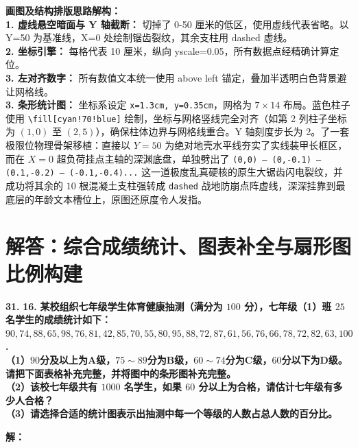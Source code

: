 \vspace{0.4cm}
{\small\color{blue!70!black}
\textbf{画图及结构排版思路解构：}\\
\textbf{1. 虚线悬空暗面与 Y 轴截断：} 切掉了 0-50 厘米的低区，使用虚线代表省略。以 Y=50 为基准线，X=0 处绘制锯齿裂纹，其余支柱用 dashed 虚线。\\
\textbf{2. 坐标引擎：} 每格代表 10 厘米，纵向 yscale=0.05，所有数据点经精确计算定位。\\
\textbf{3. 左对齐数字：} 所有数值文本统一使用 above left 锚定，叠加半透明白色背景避让网格线。\\
\textbf{3. 条形统计图：} 坐标系设定 \texttt{x=1.3cm, y=0.35cm}，网格为 $7\times 14$ 布局。蓝色柱子使用 \texttt{\textbackslash fill[cyan!70!blue]} 绘制，坐标与网格竖线完全对齐（如第 2 列柱子坐标为 $(1,0)$ 至 $(2,5)$），确保柱体边界与网格线重合。Y 轴刻度步长为 2。了一套极限位物理骨架移植：直接以 $Y=50$ 为绝对地壳水平线夯实了实线装甲长框区，而在 $X=0$ 超负荷挂点主轴的深渊底盘，单独劈出了 \texttt{(0,0) -- (0,-0.1) -- (0.1,-0.2) -- (-0.1,-0.4)...} 这一道极度乱真硬核的原生大锯齿闪电裂纹，并成功将其余的 $10$ 根混凝土支柱强转成 \texttt{dashed} 战地防崩点阵虚线，深深挂靠到最底层的年龄文本槽位上，原图还原度令人发指。\\
}
\newpage



\section{解答：综合成绩统计、图表补全与扇形图比例构建}

\vspace{0.6cm}

\textbf{\LARGE 31.} \textbf{\color{cyan!80!blue} 16. }\textbf{某校组织七年级学生体育健康抽测（满分为 $100$ 分），七年级（1）班 $25$ 名学生的成绩统计如下：\\
$90, 74, 88, 65, 98, 76, 81, 42, 85, 70, 55, 80, 95, 88, 72, 87, 61, 56, 76, 66, 78, 72, 82, 63, 100$. \\[6pt]
（1）$90$分及以上为A级，$75\sim 89$分为B级，$60\sim 74$分为C级，$60$分以下为D级。请把下面表格补充完整，并将图中的条形图补充完整。\\
（2）该校七年级共有 $1000$ 名学生，如果 $60$ 分以上为合格，请估计七年级有多少人合格？\\
（3）请选择合适的统计图表示出抽测中每一个等级的人数占总人数的百分比。}

\vspace{0.4cm}
\textbf{解：}

